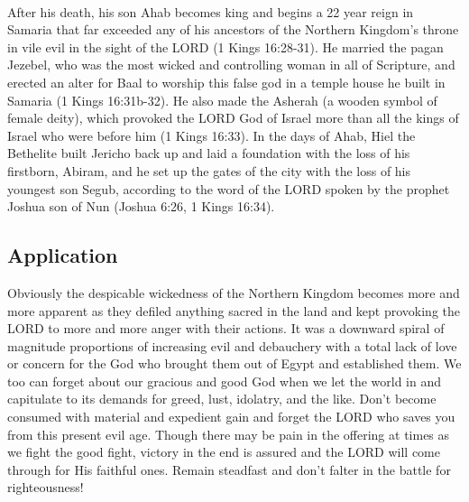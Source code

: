 \\
After his death, his son Ahab becomes king and begins a 22 year reign in Samaria that far exceeded any of his ancestors of the Northern Kingdom’s throne in vile evil in the sight of the LORD (1 Kings 16:28-31). He married the pagan Jezebel, who was the most wicked and controlling woman in all of Scripture, and erected an alter for Baal to worship this false god in a temple house he built in Samaria (1 Kings 16:31b-32). He also made the Asherah (a wooden symbol of female deity), which provoked the LORD God of Israel more than all the kings of Israel who were before him (1 Kings 16:33). In the days of Ahab, Hiel the Bethelite built Jericho back up and laid a foundation with the loss of his firstborn, Abiram, and he set up the gates of the city with the loss of his youngest son Segub, according to the word of the LORD spoken by the prophet Joshua son of Nun (Joshua 6:26, 1 Kings 16:34).

\subsection*{Application} Obviously the despicable wickedness of the Northern Kingdom becomes more and more apparent as they defiled anything sacred in the land and kept provoking the LORD to more and more anger with their actions. It was a downward spiral of magnitude proportions of increasing evil and debauchery with a total lack of love or concern for the God who brought them out of Egypt and established them. We too can forget about our gracious and good God when we let the world in and capitulate to its demands for greed, lust, idolatry, and the like. Don’t become consumed with material and expedient gain and forget the LORD who saves you from this present evil age. Though there may be pain in the offering at times as we fight the good fight, victory in the end is assured and the LORD will come through for His faithful ones. Remain steadfast and don’t falter in the battle for righteousness!